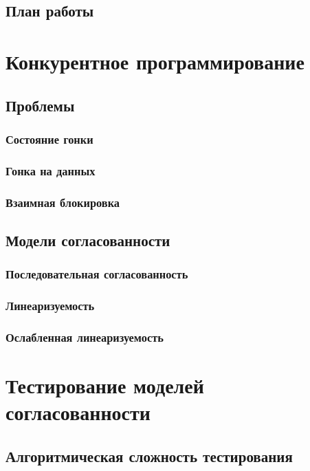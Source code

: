 \documentclass[14pt, openany]{book}
\begin{document}
\section{План работы}

\chapter{Конкурентное программирование}

\section{Проблемы}

\subsection{Состояние гонки}

\subsection{Гонка на данных}

\subsection{Взаимная блокировка}

\section{Модели согласованности}

\subsection{Последовательная согласованность}

\subsection{Линеаризуемость}

\subsection{Ослабленная линеаризуемость}

\chapter{Тестирование моделей согласованности}

\section{Алгоритмическая сложность тестирования}
\end{document}
